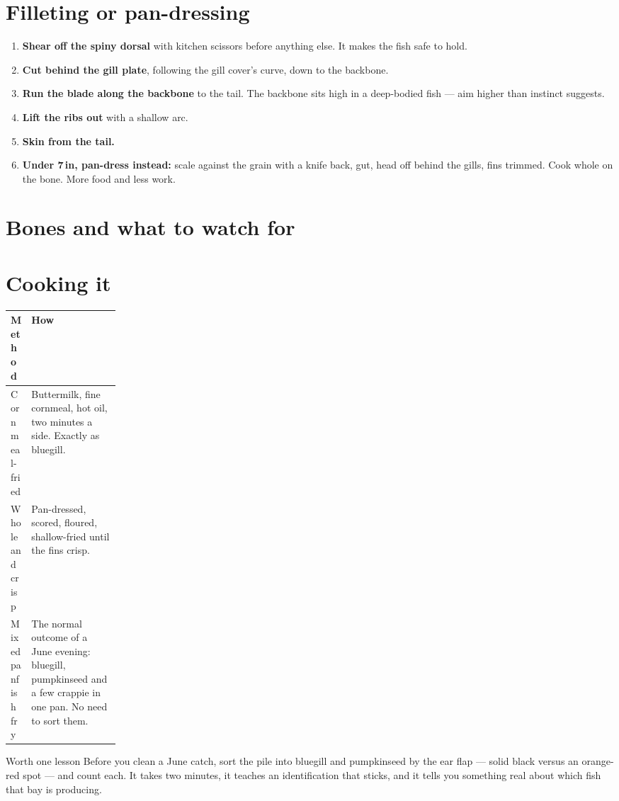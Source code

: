 \section{Filleting or pan-dressing}
\begin{enumerate}
\item \textbf{Shear off the spiny dorsal} with kitchen scissors before anything else. It makes the fish safe to hold.
\item \textbf{Cut behind the gill plate}, following the gill cover's curve, down to the backbone.
\item \textbf{Run the blade along the backbone} to the tail. The backbone sits high in a deep-bodied fish --- aim higher than instinct suggests.
\item \textbf{Lift the ribs out} with a shallow arc.
\item \textbf{Skin from the tail.}
\item \textbf{Under 7\,in, pan-dress instead:} scale against the grain with a knife back, gut, head off behind the gills, fins trimmed. Cook whole on the bone. More food and less work.
\end{enumerate}

\section{Bones and what to watch for}
\begin{telosfacts}[0.20]
\end{telosfacts}

\section{Cooking it}
\begin{tabularx}{\linewidth}{@{}p{0.18\linewidth}L@{}}
\toprule
\textbf{Method} & \textbf{How}\\
\midrule
Cornmeal-fried & Buttermilk, fine cornmeal, hot oil, two minutes a side. Exactly as bluegill. \\
Whole and crisp & Pan-dressed, scored, floured, shallow-fried until the fins crisp.\\
Mixed panfish fry & The normal outcome of a June evening: bluegill, pumpkinseed and a few crappie in one pan. No need to sort them.\\
\bottomrule
\end{tabularx}

\begin{telospanel}{Worth one lesson}
Before you clean a June catch, sort the pile into bluegill and pumpkinseed by the ear flap --- solid black versus an orange-red spot --- and count each. It takes two minutes, it teaches an identification that sticks, and it tells you something real about which fish that bay is producing. 
\end{telospanel}

\advisorypanfish

